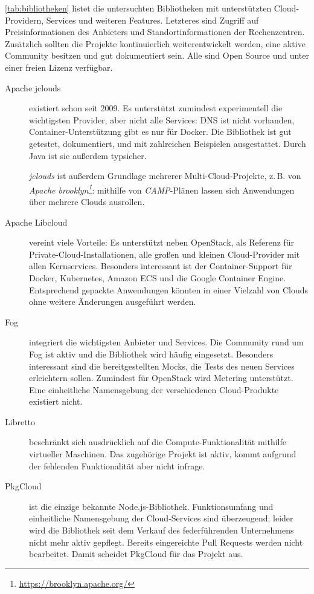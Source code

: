\autoref*{tab:bibliotheken} listet die untersuchten Bibliotheken mit unterstützten Cloud-Providern, Services und weiteren Features. Letzteres sind Zugriff auf Preisinformationen des Anbieters und Standortinformationen der Rechenzentren. Zusätzlich sollten die Projekte kontinuierlich weiterentwickelt werden, eine aktive Community besitzen und gut dokumentiert sein. Alle sind Open Source und unter einer freien Lizenz verfügbar.

\begin{description}
	
	\item[Apache jclouds] existiert schon seit 2009. Es unterstützt zumindest experimentell die wichtigsten Provider, aber nicht alle Services: DNS ist nicht vorhanden, Container-Unterstützung gibt es nur für Docker. Die Bibliothek ist gut getestet, dokumentiert, und mit zahlreichen Beispielen ausgestattet. Durch Java ist sie außerdem typsicher. 
	
	\emph{jclouds} ist außerdem Grundlage mehrerer Multi-Cloud-Projekte, z.\,B. von \emph{Apache brooklyn\footnote{\url{https://brooklyn.apache.org/}}}: mithilfe von \emph{CAMP}-Plänen lassen sich Anwendungen über mehrere Clouds ausrollen.

	\item[Apache Libcloud] vereint viele Vorteile: Es unterstützt neben OpenStack, als Referenz für Private-Cloud-Installationen, alle großen und kleinen Cloud-Provider mit allen Kernservices. Besonders interessant ist der Container-Support für Docker, Kubernetes, Amazon ECS und die Google Container Engine. Entsprechend gepackte Anwendungen könnten in einer Vielzahl von Clouds ohne weitere Änderungen ausgeführt werden.

	\item[Fog] integriert die wichtigsten Anbieter und Services. Die Community rund um Fog ist aktiv und die Bibliothek wird häufig eingesetzt. Besonders interessant sind die bereitgestellten Mocks, die Tests des neuen Services erleichtern sollen. Zumindest für OpenStack wird Metering unterstützt. Eine einheitliche Namensgebung der verschiedenen Cloud-Produkte existiert nicht.

	\item[Libretto] beschränkt sich ausdrücklich auf die Compute-Funktionalität mithilfe virtueller Maschinen. Das zugehörige Projekt ist aktiv, kommt aufgrund der fehlenden Funktionalität aber nicht infrage.

	\item[PkgCloud] ist die einzige bekannte Node.js-Bibliothek. Funktionsumfang und einheitliche Namensgebung der Cloud-Services sind überzeugend; leider wird die Bibliothek seit dem Verkauf des federführenden Unternehmens nicht mehr aktiv gepflegt. Bereits eingereichte Pull Requests werden nicht bearbeitet. Damit scheidet PkgCloud für das Projekt aus.

\end{description}

